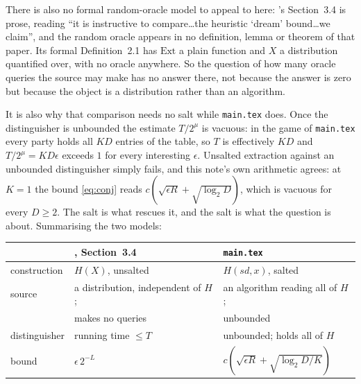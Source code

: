 \documentclass{aicr-solution}
\newcommand{\sd}{\mathit{sd}}
\begin{document}
\begin{remark}
There is also no formal random-oracle model to appeal to here: \cite{BDKPPSY11}'s Section~3.4 is
prose, reading ``it is instructive to compare\ldots the heuristic `dream' bound\ldots we claim'',
and the random oracle appears in no definition, lemma or theorem of that paper. Its formal
Definition~2.1 has $\mathrm{Ext}$ a plain function and $X$ a distribution quantified over, with no
oracle anywhere. So the question of how many oracle queries the source may make has no answer
there, not because the answer is zero but because the object is a distribution rather than an
algorithm.

It is also why that comparison needs no salt while \texttt{main.tex} does. Once the distinguisher is
unbounded the estimate $T/2^{\mu}$ is vacuous: in the game of \texttt{main.tex} every party holds
all $KD$ entries of the table, so $T$ is effectively $KD$ and $T/2^{\mu} = KD\epsilon$ exceeds $1$
for every interesting $\epsilon$. Unsalted extraction against an unbounded distinguisher simply
fails, and this note's own arithmetic agrees: at $K = 1$ the bound \eqref{eq:conj} reads
$c(\sqrt{\epsilon R} + \sqrt{\log_2 D})$, which is vacuous for every $D \ge 2$. The salt is what
rescues it, and the salt is what the question is about. Summarising the two models:
\begin{center}\small
\begin{tabular}{@{}lll@{}}
\toprule
 & \cite{BDKPPSY11}, Section~3.4 & \texttt{main.tex} \\
\midrule
construction   & $H(X)$, unsalted                        & $H(\sd,x)$, salted \\
source         & a distribution, independent of $H$;     & an algorithm reading all of $H$; \\
               & makes no queries                        & unbounded \\
distinguisher  & running time $\le T$                    & unbounded; holds all of $H$ \\
bound          & $\epsilon\,2^{-L}$                      & $c(\sqrt{\epsilon R} + \sqrt{\log_2 D / K})$ \\
\bottomrule
\end{tabular}
\end{center}
\end{remark}
\end{document}
